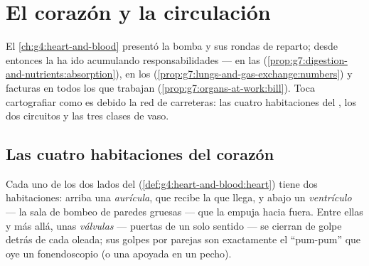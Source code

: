 \chapter{El corazón y la circulación}\label{ch:g7:heart-and-circulation}

El \cref{ch:g4:heart-and-blood} presentó la bomba y sus rondas de
reparto; desde entonces la  ha ido acumulando responsabilidades
---  en las 
(\cref{prop:g7:digestion-and-nutrients:absorption}),  en los
 (\cref{prop:g7:lungs-and-gas-exchange:numbers}) y facturas en
todos los  que trabajan
(\cref{prop:g7:organs-at-work:bill}). Toca cartografiar como es debido
la red de carreteras: las cuatro habitaciones del , los dos
circuitos y las tres clases de vaso.

\section{Las cuatro habitaciones del corazón}

\begin{definition}\label{def:g7:heart-and-circulation:rooms}
Cada uno de los dos lados del 
(\cref{def:g4:heart-and-blood:heart}) tiene dos habitaciones: arriba
una \emph{aurícula}, que recibe la  que llega, y
abajo un \emph{ventrículo} --- la sala de bombeo de
paredes gruesas --- que la empuja hacia fuera. Entre ellas y más allá,
unas \emph{válvulas} --- puertas de un solo
sentido --- se cierran de golpe detrás de cada oleada; sus golpes por
parejas son exactamente el ``pum-pum'' que oye un fonendoscopio (o una
 apoyada en un pecho).
\end{definition}

